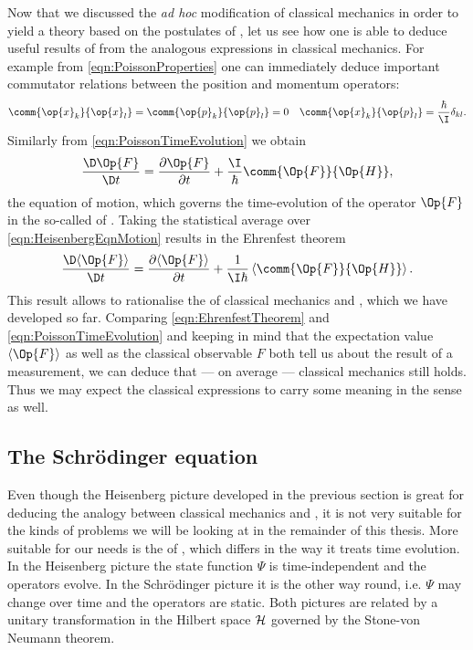 Now that we discussed the \textit{ad hoc} modification of classical mechanics
in order to yield a theory based on the postulates of \QM,
let us see how one is able to deduce useful results of \QM
from the analogous expressions in classical mechanics.
For example from \eqref{eqn:PoissonProperties} one can immediately
deduce important commutator relations between the position and momentum operators:
\begin{align}
	\comm{\op{x}_k}{\op{x}_l} &= \comm{\op{p}_k}{\op{p}_l} = 0 & \comm{\op{x}_k}{\op{p}_l} = \frac{\hbar}{\I} \delta_{kl}.
	\label{eqn:compatibilityOperator}
\end{align}
Similarly from \eqref{eqn:PoissonTimeEvolution} we obtain
\begin{equation}
	\frac{\D \Op{F}}{\D t} = \frac{\partial \Op{F}}{\partial t} + \frac{\I}{\hbar} \comm{\Op{F}}{\Op{H}},
	\label{eqn:HeisenbergEqnMotion}
\end{equation}
the equation of motion, which governs the time-evolution of the operator $\Op{F}$
in the so-called  of \QM.
Taking the statistical average over \eqref{eqn:HeisenbergEqnMotion}
results in the Ehrenfest theorem
\begin{equation}
	\frac{\D \langle \Op{F} \rangle}{\D t} = \frac{\partial \langle \Op{F} \rangle}{\partial t} + \frac{1}{\I \hbar} \left\langle \comm{\Op{F}}{\Op{H}} \right\rangle.
	\label{eqn:EhrenfestTheorem}
\end{equation}
This result allows to rationalise the 
of classical mechanics and \QM,
which we have developed so far.
Comparing \eqref{eqn:EhrenfestTheorem} and \eqref{eqn:PoissonTimeEvolution}
and keeping in mind that the expectation value $\langle \Op{F} \rangle$
as well as the classical observable $F$ both tell us about the result
of a measurement,
we can deduce that --- on average --- classical mechanics still holds.
Thus we may expect the classical expressions to carry some meaning
in the \QM sense as well.

\subsection{The Schrödinger equation}
Even though the Heisenberg picture developed
in the previous section is great for deducing the analogy between
classical mechanics and \QM,
it is not very suitable for the kinds of problems we will be looking
at in the remainder of this thesis.
More suitable for our needs is the  of \QM,
which differs in the way it treats time evolution.
In the Heisenberg picture the state function $\Psi$ is time-independent
and the operators evolve.
In the Schrödinger picture it is the other way round, i.e. $\Psi$ may change over time
and the operators are static.
Both pictures are related by a unitary transformation
in the Hilbert space $\mathcal{H}$
governed by the Stone-von Neumann theorem.

